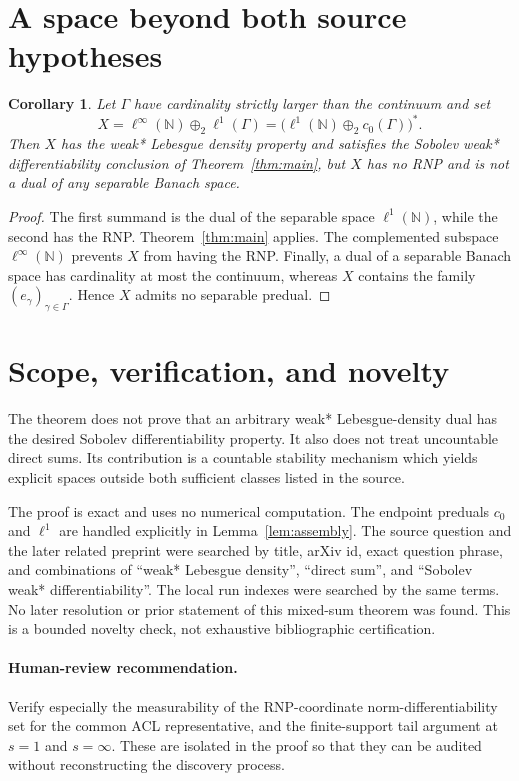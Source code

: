 \documentclass[11pt]{article}
\newtheorem{corollary}[theorem]{Corollary}
\theoremstyle{remark}
\newcommand{\N}{\mathbb{N}}
\begin{document}
\section{A space beyond both source hypotheses}

\begin{corollary}\label{cor:example}
Let $\Gamma$ have cardinality strictly larger than the continuum and set
\[
 X=\ell^\infty(\N)\oplus_2\ell^1(\Gamma)
   =\bigl(\ell^1(\N)\oplus_2c_0(\Gamma)\bigr)^*.
\]
Then $X$ has the weak* Lebesgue density property and satisfies the Sobolev
weak* differentiability conclusion of Theorem~\ref{thm:main}, but $X$ has no
RNP and is not a dual of any separable Banach space.
\end{corollary}

\begin{proof}
The first summand is the dual of the separable space $\ell^1(\N)$, while the
second has the RNP.  Theorem~\ref{thm:main} applies.  The complemented
subspace $\ell^\infty(\N)$ prevents $X$ from having the RNP.  Finally, a dual
of a separable Banach space has cardinality at most the continuum, whereas
$X$ contains the family $(e_\gamma)_{\gamma\in\Gamma}$.  Hence $X$ admits no
separable predual.
\end{proof}

\section{Scope, verification, and novelty}

The theorem does not prove that an arbitrary weak* Lebesgue-density dual has
the desired Sobolev differentiability property.  It also does not treat
uncountable direct sums.  Its contribution is a countable stability mechanism
which yields explicit spaces outside both sufficient classes listed in the
source.

The proof is exact and uses no numerical computation.  The endpoint preduals
$c_0$ and $\ell^1$ are handled explicitly in Lemma~\ref{lem:assembly}.  The
source question and the later related preprint \cite{Evseev} were searched by
title, arXiv id, exact question phrase, and combinations of ``weak* Lebesgue
density'', ``direct sum'', and ``Sobolev weak* differentiability''.  The local
run indexes were searched by the same terms.  No later resolution or prior
statement of this mixed-sum theorem was found.  This is a bounded novelty
check, not exhaustive bibliographic certification.

\paragraph{Human-review recommendation.}
Verify especially the measurability of the RNP-coordinate norm-differentiability
set for the common ACL representative, and the finite-support tail argument at
$s=1$ and $s=\infty$.  These are isolated in the proof so that they can be
audited without reconstructing the discovery process.
\end{document}
